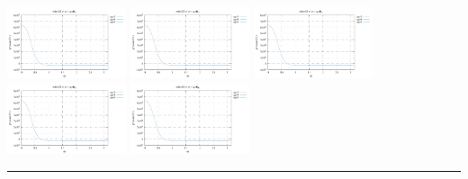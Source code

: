 \noindent
\includegraphics[width=3.5cm]{python_codes/fieldstone_152/RESULTS/exp3/qqq_64_m2}
\includegraphics[width=3.5cm]{python_codes/fieldstone_152/RESULTS/exp3/qqq_64_m3}
\includegraphics[width=3.5cm]{python_codes/fieldstone_152/RESULTS/exp3/qqq_64_m4}
\includegraphics[width=3.5cm]{python_codes/fieldstone_152/RESULTS/exp3/qqq_64_m5}
\includegraphics[width=3.5cm]{python_codes/fieldstone_152/RESULTS/exp3/qqq_64_m6}

\hrule

